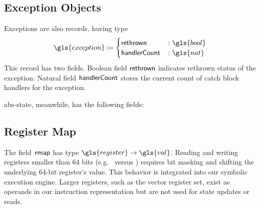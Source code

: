 \subsection{Exception Objects}
\begin{definition}
  Exceptions are also records, having type
  \begin{equation*}
    \gls{exception}\coloneqq\begin{cases}
      \rethrown &\colon \gls{bool} \\
      \handlerCount &\colon \gls{nat}
    \end{cases}
  \end{equation*}
  This record has two fields.
  Boolean field $\mathsf{rethrown}$ indicates rethrown status of the exception.
  Natural field $\mathsf{handlerCount}$ stores the current count of catch block handlers for the exception.
\end{definition}
\Gls{abs-state}, meanwhile, has the following fields:

\subsection{Register Map}
The field~$\operatorname{\mathsf{rmap}}$ has type $\gls{register}\to\gls{val}$.
Reading and writing registers smaller than 64 bits (e.g.\  versus \rbp) requires bit masking and shifting the underlying 64-bit register's value.
This behavior is integrated into our symbolic execution engine.
Larger registers, such as the  vector register set, exist as operands in our instruction representation but are not used for state updates or reads.

